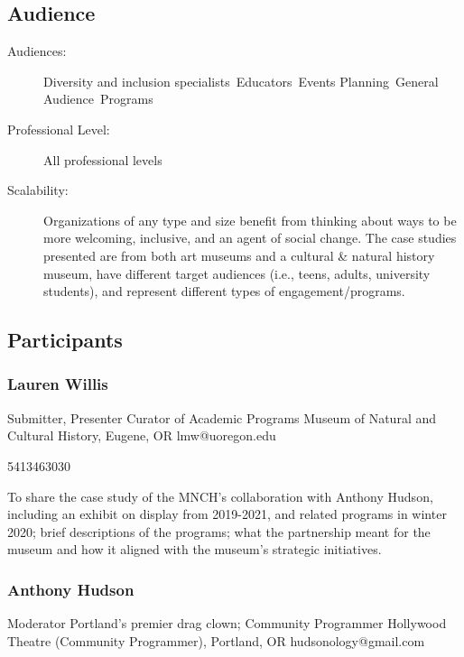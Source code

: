 \documentclass{report}
\begin{document}
              \subsection*{Audience}
                \begin{description}
                  \item [Audiences:]Diversity and inclusion specialists~Educators~Events Planning~General Audience~Programs~
                  \item[Professional Level:]All professional levels~
                \item[Scalability:] Organizations of any type and size benefit from thinking about ways to be more welcoming, inclusive, and an agent of social change. The case studies presented are from both art museums and a cultural \& natural history museum, have different target audiences (i.e., teens, adults, university students), and represent different types of engagement/programs.

							
              \end{description}
            \subsection*{Participants}
              \subsubsection*{ Lauren Willis }
              Submitter, Presenter\newline
              Curator of Academic Programs\newline
              Museum of Natural and Cultural History, Eugene, OR
              \newline
              lmw@uoregon.edu\newline
              
              5413463030\newline

              To share the case study of the MNCH’s collaboration with Anthony Hudson, including an exhibit on display from 2019-2021, and related programs in winter 2020; brief descriptions of the programs; what the partnership meant for the museum and how it aligned with the museum’s strategic initiatives.\newline


              
                \subsubsection*{ Anthony Hudson }
                Moderator\newline
                Portland’s premier drag clown; Community Programmer\newline
                Hollywood Theatre (Community Programmer), Portland, OR
                \newline
                hudsonology@gmail.com\newline
                
\end{document}
